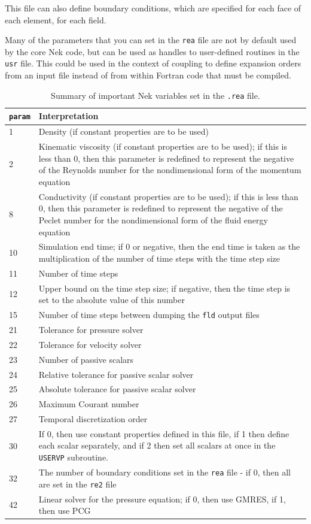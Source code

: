 \documentclass[10pt]{article}
\numberwithin{equation}{section} %
\begin{document}
\begin{itemize}
This file can also define boundary conditions, which are specified for each face of each element, for each field. 

Many of the parameters that you can set in the {\tt rea} file are not by default used by the core Nek code, but can be used as handles to user-defined routines in the {\tt usr} file. This could be used in the context of coupling to define expansion orders from an input file instead of from within Fortran code that must be compiled.

\begin{table}[H]
\caption{Summary of important Nek variables set in the {\tt .rea} file.}
\centering
\begin{tabular}{p{1cm}p{14cm}}
\hline\hline
{\tt param} & Interpretation \\ [0.5ex]
\hline
1 & Density (if constant properties are to be used)\\
2 & Kinematic viscosity (if constant properties are to be used); if this is less than 0, then this parameter is redefined to represent the negative of the Reynolds number for the nondimensional form of the momentum equation\\
8 & Conductivity (if constant properties are to be used); if this is less than 0, then this parameter is redefined to represent the negative of the Peclet number for the nondimensional form of the fluid energy equation\\
10 & Simulation end time; if 0 or negative, then the end time is taken as the multiplication of the number of time steps with the time step size\\
11 & Number of time steps\\
12 & Upper bound on the time step size; if negative, then the time step is set to the absolute value of this number\\
15 & Number of time steps between dumping the {\tt fld} output files\\
21 & Tolerance for pressure solver\\
22 & Tolerance for velocity solver\\
23 & Number of passive scalars\\
24 & Relative tolerance for passive scalar solver\\
25 & Absolute tolerance for passive scalar solver\\
26 & Maximum Courant number\\
27 & Temporal discretization order\\
30 & If 0, then use constant properties defined in this file, if 1 then define each scalar separately, and if 2 then set all scalars at once in the {\tt USERVP} subroutine.\\
32 & The number of boundary conditions set in the {\tt rea} file - if 0, then all are set in the {\tt re2} file\\
42 & Linear solver for the pressure equation; if 0, then use GMRES, if 1, then use PCG\\
\hline
\end{tabular}
\end{table}


\end{itemize}
\end{document}
